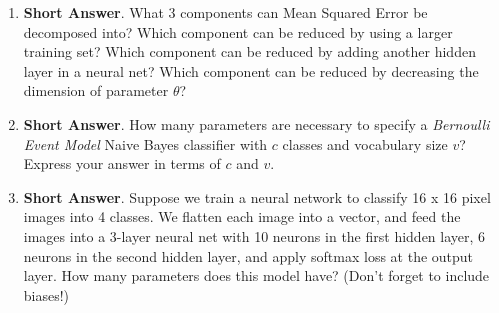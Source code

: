 \documentclass{article}
\newif\ifsolutions
\newenvironment{labelledanswer}{{\bf Answer:} \sf }{}%
\newcommand{\answer}[2]
{{
\ifsolutions
\begin{labelledanswer}
\color{red} 
#2
\end{labelledanswer}
\else
#1
\fi
}}
\begin{document}
\begin{enumerate}

\item \textbf{Short Answer}. 
What 3 components can Mean Squared Error be decomposed into? Which component can be reduced by using a larger training set? Which component can be reduced by adding another hidden layer in a neural net? Which component can be reduced by decreasing the dimension of parameter $\theta$?

\answer{}{
MSE =  Irreducible Error+ Bias$^2$ + Variance\\

Which component can be reduced by using a larger training set? Variance. This leads to the model potentially reduce the gap between cross-validation error and training error through learning from more examples.  \\
Which component can be reduced by adding another hidden layer in a neural net?  Bias. The model is now bigger and more complicated, leading it to learn more pontentially from its current set of features. Training error might be lower, indicating lower bias.\\
Which component can be reduced by decreasing the dimension of parameter $\theta$? This action would means that the parameter would have less expressive power. Depending on the data, this might cause it to perform worse on training error. An example if we're reducing parameters to 1 dimension, but we're predicting data that's much better expressed in 3 dimensions. Therefore, this seems to increase bias which might result in increase in variance. \\
}

\item \textbf{Short Answer}. 
How many parameters are necessary to specify a \emph{Bernoulli Event Model} Naive Bayes classifier with $c$ classes and vocabulary size $v$? Express your answer in terms of $c$ and $v$.

\answer{}{We would need $v\times c$ parameters in total.}

\item \textbf{Short Answer}.
Suppose we train a neural network to classify 16 x 16 pixel images into 4 classes. We flatten each image into a vector, and feed the images into a 3-layer neural net with 10 neurons in the first hidden layer, 6 neurons in the second hidden layer, and apply softmax loss at the output layer. How many parameters does this model have? (Don't forget to include biases!)

\answer{}{
For the first layer, the number of params = $(10 \times (16 \times 16)) + 10 = (10 \times 256) + 10$.\\
For the second layer, the number of params = $(6 \times 10) + 6$.\\
For the third layer, the number of params = $(4 \times 6) + 4$.\\
The model has 2664 parameters in total.\\\
}


\end{enumerate}
\end{document}
